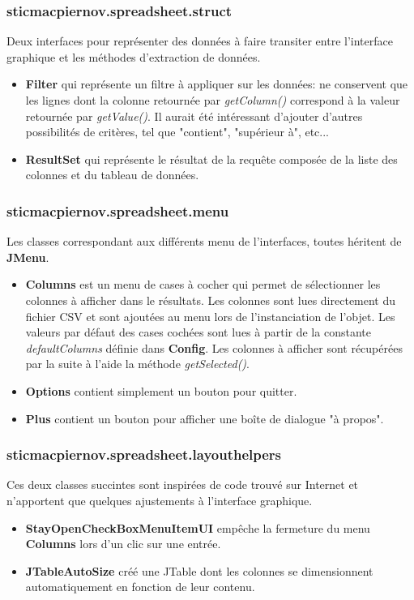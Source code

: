 \documentclass{article}
\begin{document}
\subsubsection{sticmacpiernov.spreadsheet.struct}
Deux interfaces pour représenter des données à faire transiter entre l'interface graphique et les méthodes d'extraction de données.
\begin{itemize}
  \item \textbf{Filter} qui représente un filtre à appliquer sur les données: ne conservent que les lignes dont la colonne retournée par \textit{getColumn()} correspond à la valeur retournée par \textit{getValue()}. Il aurait été intéressant d'ajouter d'autres possibilités de critères, tel que "contient", "supérieur à", etc...
  \item \textbf{ResultSet} qui représente le résultat de la requête composée de la liste des colonnes et du tableau de données.
\end{itemize}
\subsubsection{sticmacpiernov.spreadsheet.menu}
Les classes correspondant aux différents menu de l'interfaces, toutes héritent de \textbf{JMenu}.
\begin{itemize}
  \item \textbf{Columns} est un menu de cases à cocher qui permet de sélectionner les colonnes à afficher dans le résultats. Les colonnes sont lues directement du fichier CSV et sont ajoutées au menu lors de l'instanciation de l'objet. Les valeurs par défaut des cases cochées sont lues à partir de la constante \textit{defaultColumns} définie dans \textbf{Config}. Les colonnes à afficher sont récupérées par la suite à l'aide la méthode \textit{getSelected()}.
  \item \textbf{Options} contient simplement un bouton pour quitter.
  \item \textbf{Plus} contient un bouton pour afficher une boîte de dialogue "à propos".
\end{itemize}
\subsubsection{sticmacpiernov.spreadsheet.layouthelpers}
Ces deux classes succintes sont inspirées de code trouvé sur Internet et n'apportent que quelques ajustements à l'interface graphique.
\begin{itemize}
  \item \textbf{StayOpenCheckBoxMenuItemUI} empêche la fermeture du menu \textbf{Columns} lors d'un clic sur une entrée.
  \item \textbf{JTableAutoSize} créé une JTable dont les colonnes se dimensionnent automatiquement en fonction de leur contenu.
\end{itemize}
\end{document}
